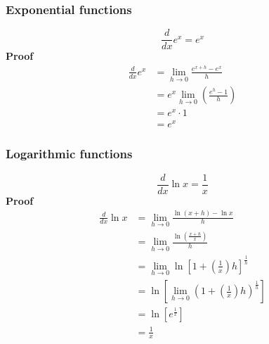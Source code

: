 \documentclass{article}
\begin{document}
\subsubsection{Exponential functions}
\begin{equation*}
    \frac{d}{dx} e^{x} =e^{x}
\end{equation*}
\textbf{Proof}
\begin{equation*}
\begin{aligned}
    \frac{d}{dx} e^{x} & =\lim _{h\rightarrow 0}\frac{e^{x+h} -e^{x}}{h}\\
     & =e^{x}\lim _{h\rightarrow 0}\left(\frac{e^{h} -1}{h}\right)\\
     & =e^{x} \cdot 1\\
     & =e^{x}
\end{aligned}
\end{equation*}
\subsubsection{Logarithmic functions}
\begin{equation*}
    \frac{d}{dx}\ln x=\frac{1}{x}
\end{equation*}
\textbf{Proof}
\begin{equation*}
\begin{aligned}
    \frac{d}{dx}\ln x & =\lim _{h\rightarrow 0}\frac{\ln( x+h) -\ln x}{h}\\
     & =\lim _{h\rightarrow 0}\frac{\ln\left(\frac{x+h}{x}\right)}{h}\\
     & =\lim _{h\rightarrow 0}\ln\left[ 1+\left(\frac{1}{x}\right) h\right]^{\frac{1}{h}}\\
     & =\ln\left[\lim _{h\rightarrow 0}\left( 1+\left(\frac{1}{x}\right) h\right)^{\frac{1}{h}}\right]\\
     & =\ln\left[ e^{\frac{1}{x}}\right]\\
     & =\frac{1}{x}
\end{aligned}
\end{equation*}
\end{document}

